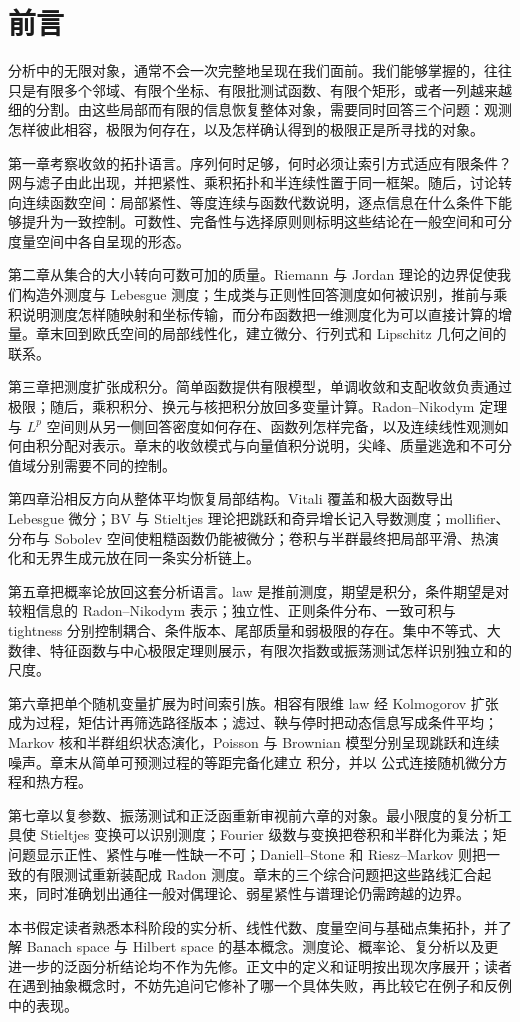 \chapter*{前言}

分析中的无限对象，通常不会一次完整地呈现在我们面前。我们能够掌握的，往往只是有限多个邻域、有限个坐标、有限批测试函数、有限个矩形，或者一列越来越细的分割。由这些局部而有限的信息恢复整体对象，需要同时回答三个问题：观测怎样彼此相容，极限为何存在，以及怎样确认得到的极限正是所寻找的对象。

第一章考察收敛的拓扑语言。序列何时足够，何时必须让索引方式适应有限条件？网与滤子由此出现，并把紧性、乘积拓扑和半连续性置于同一框架。随后，讨论转向连续函数空间：局部紧性、等度连续与函数代数说明，逐点信息在什么条件下能够提升为一致控制。可数性、完备性与选择原则则标明这些结论在一般空间和可分度量空间中各自呈现的形态。

第二章从集合的大小转向可数可加的质量。Riemann 与 Jordan 理论的边界促使我们构造外测度与 Lebesgue 测度；生成类与正则性回答测度如何被识别，推前与乘积说明测度怎样随映射和坐标传输，而分布函数把一维测度化为可以直接计算的增量。章末回到欧氏空间的局部线性化，建立微分、行列式和 Lipschitz 几何之间的联系。

第三章把测度扩张成积分。简单函数提供有限模型，单调收敛和支配收敛负责通过极限；随后，乘积积分、换元与核把积分放回多变量计算。Radon--Nikodym 定理与 $L^p$ 空间则从另一侧回答密度如何存在、函数列怎样完备，以及连续线性观测如何由积分配对表示。章末的收敛模式与向量值积分说明，尖峰、质量逃逸和不可分值域分别需要不同的控制。

第四章沿相反方向从整体平均恢复局部结构。Vitali 覆盖和极大函数导出 Lebesgue 微分；BV 与 Stieltjes 理论把跳跃和奇异增长记入导数测度；mollifier、分布与 Sobolev 空间使粗糙函数仍能被微分；卷积与半群最终把局部平滑、热演化和无界生成元放在同一条实分析链上。

第五章把概率论放回这套分析语言。law 是推前测度，期望是积分，条件期望是对较粗信息的 Radon--Nikodym 表示；独立性、正则条件分布、一致可积与 tightness 分别控制耦合、条件版本、尾部质量和弱极限的存在。集中不等式、大数律、特征函数与中心极限定理则展示，有限次指数或振荡测试怎样识别独立和的尺度。

第六章把单个随机变量扩展为时间索引族。相容有限维 law 经 Kolmogorov 扩张成为过程，矩估计再筛选路径版本；滤过、鞅与停时把动态信息写成条件平均；Markov 核和半群组织状态演化，Poisson 与 Brownian 模型分别呈现跳跃和连续噪声。章末从简单可预测过程的等距完备化建立 \Ito{} 积分，并以 \Ito{} 公式连接随机微分方程和热方程。

第七章以复参数、振荡测试和正泛函重新审视前六章的对象。最小限度的复分析工具使 Stieltjes 变换可以识别测度；Fourier 级数与变换把卷积和半群化为乘法；矩问题显示正性、紧性与唯一性缺一不可；Daniell--Stone 和 Riesz--Markov 则把一致的有限测试重新装配成 Radon 测度。章末的三个综合问题把这些路线汇合起来，同时准确划出通往一般对偶理论、弱星紧性与谱理论仍需跨越的边界。

本书假定读者熟悉本科阶段的实分析、线性代数、度量空间与基础点集拓扑，并了解 Banach space 与 Hilbert space 的基本概念。测度论、概率论、复分析以及更进一步的泛函分析结论均不作为先修。正文中的定义和证明按出现次序展开；读者在遇到抽象概念时，不妨先追问它修补了哪一个具体失败，再比较它在例子和反例中的表现。
